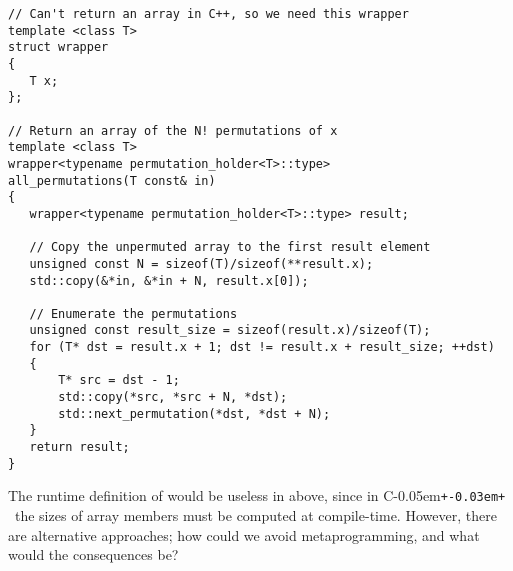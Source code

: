 \documentclass{kapproc}
\newcommand{\Cpp}{C\kern-0.05em\texttt{+\kern-0.03em+}%
}
\newcommand{\mping}{meta\-pro\-gram\-ming}
\begin{document}
{\small
\begin{codesamp}\begin{verbatim}
// Can't return an array in C++, so we need this wrapper
template <class T>
struct wrapper
{
   T x;
};

// Return an array of the N! permutations of x
template <class T>
wrapper<typename permutation_holder<T>::type>
all_permutations(T const& in)
{
   wrapper<typename permutation_holder<T>::type> result;

   // Copy the unpermuted array to the first result element
   unsigned const N = sizeof(T)/sizeof(**result.x);
   std::copy(&*in, &*in + N, result.x[0]);

   // Enumerate the permutations
   unsigned const result_size = sizeof(result.x)/sizeof(T);
   for (T* dst = result.x + 1; dst != result.x + result_size; ++dst)
   {
       T* src = dst - 1;
       std::copy(*src, *src + N, *dst);
       std::next_permutation(*dst, *dst + N);
   }
   return result;
}
\end{verbatim}
\end{codesamp}
}



The runtime definition of  would be useless in
 above, since in \Cpp\ the sizes of array
members must be computed at compile-time. However, there are
alternative approaches; how could we avoid \mping, and what would the
consequences be?
\end{document}
